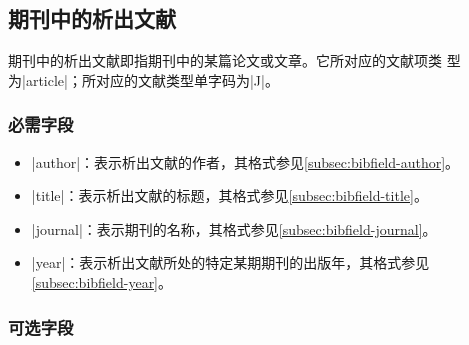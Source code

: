

\subsection{期刊中的析出文献}\label{subsec:bibtype-article}

期刊中的析出文献即指期刊中的某篇论文或文章\cite{gbt7714-2005}。它所对应的{\BibTeX}文献项类
型为|article|；所对应的文献类型单字码为|J|\cite{gbt3469-1983}。

\subsubsection{必需字段}

\begin{itemize}
\item |author|：表示析出文献的作者，其格式参见\ref{subsec:bibfield-author}。
\item |title|：表示析出文献的标题，其格式参见\ref{subsec:bibfield-title}。
\item |journal|：表示期刊的名称，其格式参见\ref{subsec:bibfield-journal}。
\item |year|：表示析出文献所处的特定某期期刊的出版年，其格式参见\ref{subsec:bibfield-year}。
\end{itemize}

\subsubsection{可选字段}

